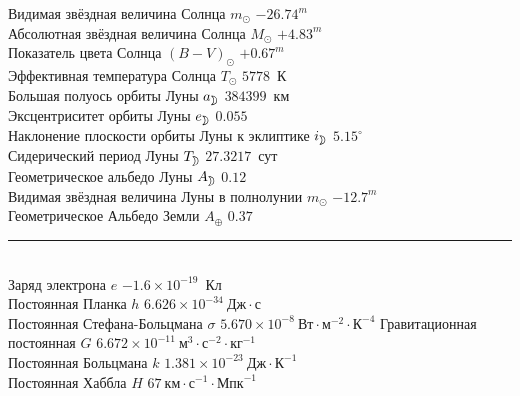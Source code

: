 Видимая звёздная величина Солнца $m_\odot$ \hfill $-26.74^m$\\
Абсолютная звёздная величина Солнца $M_\odot$ \hfill $+4.83^m$\\
Показатель цвета Солнца $(B - V)_\odot$ \hfill $+0.67^m$\\
Эффективная температура Солнца $T_\odot$ \hfill $5778$~К\\
Большая полуось орбиты Луны $a_{\moon}$ \hfill $384399$~км\\
Эксцентриситет орбиты Луны $e_{\moon}$ \hfill $0.055$\\
Наклонение плоскости орбиты Луны к эклиптике $i_{\moon}$ \hfill $5.15^\circ$\\
Сидерический период Луны $T_{\moon}$ \hfill $27.3217$~сут\\
Геометрическое альбедо Луны $A_{\moon}$ \hfill $0.12$\\
Видимая звёздная величина Луны в полнолунии $m_{\odot}$ \hfill $-12.7^m$\\
Геометрическое Альбедо Земли $A_\oplus$ \hfill $0.37$\\[-5pt]
\rule{\tw}{.7pt}\\
Заряд электрона $e$ \hfill $-1.6 \times 10^{-19}$~Кл\\
Постоянная Планка $h$ \hfill $6.626 \times 10^{-34}~\text{Дж}\cdot\text{с}$\\
Постоянная Стефана-Больцмана $\sigma$ \hfill $5.670 \times 10^{-8}~\text{Вт} \cdot \text{м}^{-2} \cdot \text{К}^{-4}$
Гравитационная постоянная $G$ \hfill $6.672 \times 10^{-11}~\text{м}^3 \cdot \text{с}^{-2} \cdot \text{кг}^{-1}$\\
Постоянная Больцмана $k$ \hfill $1.381 \times 10^{-23}~\text{Дж} \cdot \text{К}^{-1}$\\
Постоянная Хаббла $H$ \hfill $67~\text{км} \cdot \text{с}^{-1} \cdot \text{Мпк}^{-1}$


























